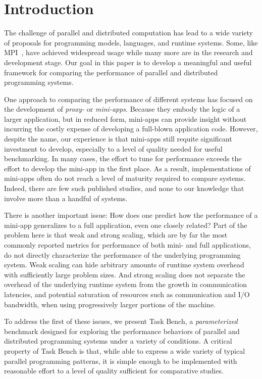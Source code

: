 \section{Introduction}
\label{sec:introduction}

The challenge of parallel and distributed computation has lead to a
wide variety of proposals for programming models, languages, and
runtime systems. Some, like MPI~\cite{MPI}, have achieved widespread
usage while many more are in the research and development stage. Our
goal in this paper is to develop a meaningful and useful framework for
comparing the performance of parallel and distributed programming
systems.


One approach to comparing the performance of different systems has
focused on the development of \emph{proxy-} or
\emph{mini-apps}. Because they embody the logic of a larger
application, but in reduced form, mini-apps can provide insight
without incurring the costly expense of developing a full-blown
application code. However, despite the name, our experience is that
mini-apps still requite significant investment to develop, especially
to a level of quality needed for useful benchmarking. In many cases,
the effort to tune for performance exceeds the effort to develop the
mini-app in the first place. As a result, implementations of mini-apps
often do not reach a level of maturity required to compare
systems. Indeed, there are few such published studies, and none to our
knowledge that involve more than a handful of systems.

There is another important issue: How does one predict how
the performance of a mini-app generalizes to a full
application, even one closely related? Part of the problem here is
that weak and strong scaling, which are by far the most commonly
reported metrics for performance of both mini- and full applications,
do not directly characterize the performance of the underlying
programming system. Weak scaling can hide arbitrary amounts of runtime
system overhead with sufficiently large problem sizes. And strong
scaling does not separate the overhead of the underlying runtime
system from the growth in communication latencies, and potential
saturation of resources such as communication and I/O bandwidth, when
using progressively larger portions of the machine.

To address the first of these issues, we present Task Bench, a
\emph{parameterized} benchmark designed for exploring the performance
behaviors of parallel and distributed programming systems under a
variety of conditions. A critical property of Task Bench is that,
while able to express a wide variety of typical parallel programming
patterns, it is simple enough to be implemented with reasonable effort
to a level of quality sufficient for comparative studies.

